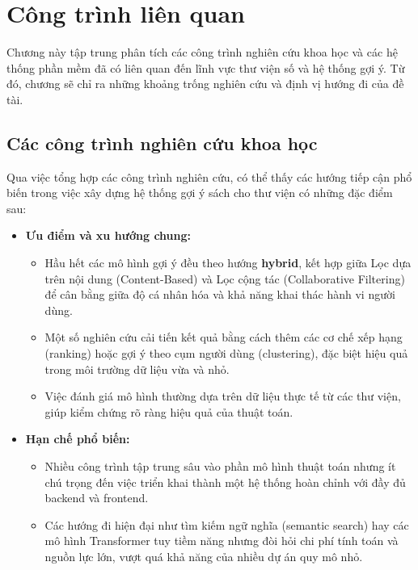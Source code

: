 \chapter{Công trình liên quan}

Chương này tập trung phân tích các công trình nghiên cứu khoa học và các hệ thống phần mềm đã có liên quan đến lĩnh vực thư viện số và hệ thống gợi ý. Từ đó, chương sẽ chỉ ra những khoảng trống nghiên cứu và định vị hướng đi của đề tài.

\section{Các công trình nghiên cứu khoa học}

Qua việc tổng hợp các công trình nghiên cứu, có thể thấy các hướng tiếp cận phổ biến trong việc xây dựng hệ thống gợi ý sách cho thư viện có những đặc điểm sau:

\begin{itemize}
    \item \textbf{Ưu điểm và xu hướng chung:}
    \begin{itemize}
        \item Hầu hết các mô hình gợi ý đều theo hướng \textbf{hybrid}, kết hợp giữa Lọc dựa trên nội dung (Content-Based) và Lọc cộng tác (Collaborative Filtering) để cân bằng giữa độ cá nhân hóa và khả năng khai thác hành vi người dùng.
        \item Một số nghiên cứu cải tiến kết quả bằng cách thêm các cơ chế xếp hạng (ranking) hoặc gợi ý theo cụm người dùng (clustering), đặc biệt hiệu quả trong môi trường dữ liệu vừa và nhỏ.
        \item Việc đánh giá mô hình thường dựa trên dữ liệu thực tế từ các thư viện, giúp kiểm chứng rõ ràng hiệu quả của thuật toán.
    \end{itemize}

    \item \textbf{Hạn chế phổ biến:}
    \begin{itemize}
        \item Nhiều công trình tập trung sâu vào phần mô hình thuật toán nhưng ít chú trọng đến việc triển khai thành một hệ thống hoàn chỉnh với đầy đủ backend và frontend.
        \item Các hướng đi hiện đại như tìm kiếm ngữ nghĩa (semantic search) hay các mô hình Transformer tuy tiềm năng nhưng đòi hỏi chi phí tính toán và nguồn lực lớn, vượt quá khả năng của nhiều dự án quy mô nhỏ.
    \end{itemize}
\end{itemize}

